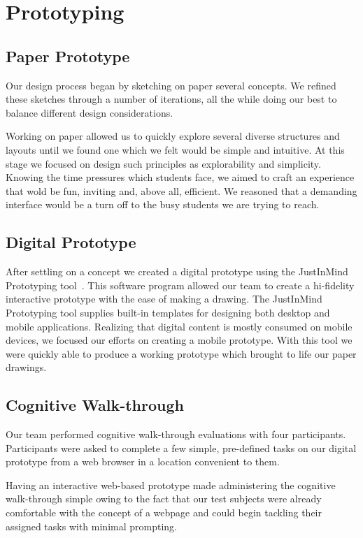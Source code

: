 \documentclass{sigchi-ext}
\begin{document}
\section{Prototyping}


\subsection{Paper Prototype}

Our design process began by sketching on paper several concepts. We refined these sketches through a
number of iterations, all the while doing our best to balance different design considerations.

Working on paper allowed us to quickly explore several diverse structures and layouts until we found
one which  we felt would be simple and intuitive.  At this stage we focused on design such
principles as explorability and simplicity. Knowing the time pressures which students face, we aimed
to craft an experience that wold be fun, inviting and, above all, efficient. We reasoned that a
demanding interface would be a turn off to the busy students we are trying to reach.


\subsection{Digital Prototype}

After settling on a concept we created a digital prototype using the JustInMind Prototyping
tool~\cite{justinmind}. This software program allowed our team to create a hi-fidelity interactive
prototype with the ease of making a drawing. The JustInMind Prototyping tool supplies built-in
templates for designing both desktop and mobile applications. Realizing that digital content is
mostly consumed on mobile devices, we focused our efforts on creating a mobile prototype. With this
tool we were quickly able to produce a working prototype which brought to life our paper drawings.


\subsection{Cognitive Walk-through}

Our team performed cognitive walk-through evaluations with four participants. Participants were
asked to complete a few simple, pre-defined tasks on our digital prototype from a web browser in a
location convenient to them. 

Having an interactive web-based prototype made administering the cognitive walk-through simple owing
to the fact that our test subjects were already comfortable with the concept of a webpage and could
begin tackling their assigned tasks with minimal prompting.
\end{document}
